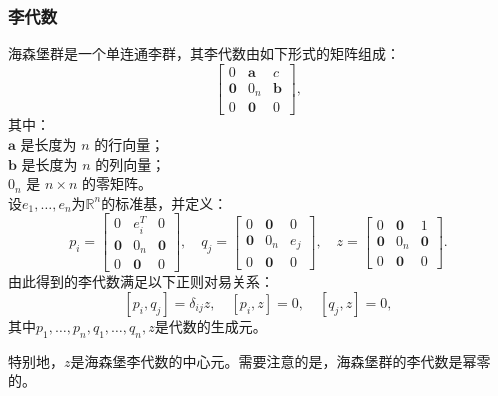 \subsubsection{李代数}
海森堡群是一个单连通李群，其李代数由如下形式的矩阵组成：
$$
\begin{bmatrix}
0 & \mathbf{a} & c \\
\mathbf{0} & 0_{n} & \mathbf{b} \\
0 & \mathbf{0} & 0
\end{bmatrix},~
$$
其中：\\
$\mathbf{a}$ 是长度为 $n$ 的行向量；\\
$\mathbf{b}$ 是长度为 $n$ 的列向量；\\
$0_{n}$ 是 $n \times n$ 的零矩阵。\\
设$e_{1}, \ldots, e_{n}$为$\mathbb{R}^{n}$的标准基，并定义：
$$
p_{i} =
\begin{bmatrix}
0 & e_{i}^{T} & 0 \\
\mathbf{0} & 0_{n} & \mathbf{0} \\
0 & \mathbf{0} & 0
\end{bmatrix}, \quad
q_{j} =
\begin{bmatrix}
0 & \mathbf{0} & 0 \\
\mathbf{0} & 0_{n} & e_{j} \\
0 & \mathbf{0} & 0
\end{bmatrix}, \quad
z =
\begin{bmatrix}
0 & \mathbf{0} & 1 \\
\mathbf{0} & 0_{n} & \mathbf{0} \\
0 & \mathbf{0} & 0
\end{bmatrix}.~
$$
由此得到的李代数满足以下正则对易关系：
$$
[p_{i}, q_{j}] = \delta_{ij} z, \quad [p_{i}, z] = 0, \quad [q_{j}, z] = 0,~
$$
其中$p_{1}, \ldots, p_{n}, q_{1}, \ldots, q_{n}, z$是代数的生成元。

特别地，$z$是海森堡李代数的中心元。需要注意的是，海森堡群的李代数是幂零的。
